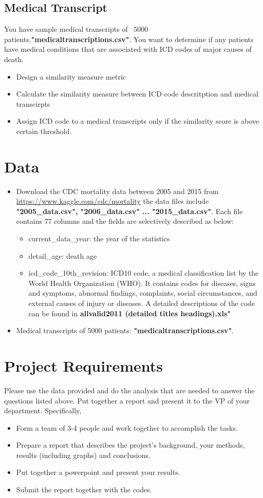 \documentclass{article}
\begin{document}
\subsection{Medical Transcript}
You have sample medical transcripts of ~5000 patients.\textbf{"medicaltranscriptions.csv"}. You want to determine if any patients have medical conditions that are associated with ICD codes of major causes of death.
\begin{itemize}
\item Design a similarity measure metric
\item Calculate the similarity measure between ICD code descritption and medical transcirpts
\item Assign ICD code to a medical transcripts only if the similarity score is above certain threshold.
\end{itemize}

\section{Data} %
\begin{itemize}
\item Download the CDC mortality data between 2005 and 2015 from \url{https://www.kaggle.com/cdc/mortality} the data files include \textbf{"2005\_data.csv", "2006\_data.csv" ... "2015\_data.csv"}. Each file contains 77 columns and the fields are selectively described as below:
\begin{itemize}
\item current\_data\_year: the year of the statistics
\item detail\_age: death age
\item icd\_code\_10th\_revision: ICD10 code, a medical classification list by the World Health Organization (WHO). It contains codes for diseases, signs and symptoms, abnormal findings, complaints, social circumstances, and external causes of injury or diseases. A detailed descriptions of the code can be found in \textbf{allvalid2011 (detailed titles headings).xls"}
\end{itemize}
\item Medical transcripts of 5000 patients: \textbf{"medicaltranscriptions.csv"}.

\end{itemize}

\section{Project Requirements}
Please use the data provided and do the analysis that are needed to answer the questions listed above. Put together a report and present it to the VP of your department. Specifically, 
\begin{itemize}
\item Form a team of 3-4 people and work together to accomplish the tasks.
\item Prepare a report that describes the project's background, your methods, results (including graphs) and conclusions.
\item Put together a powerpoint and present your results.
\item Submit the report together with the codes.
\end{itemize}
\end{document}
